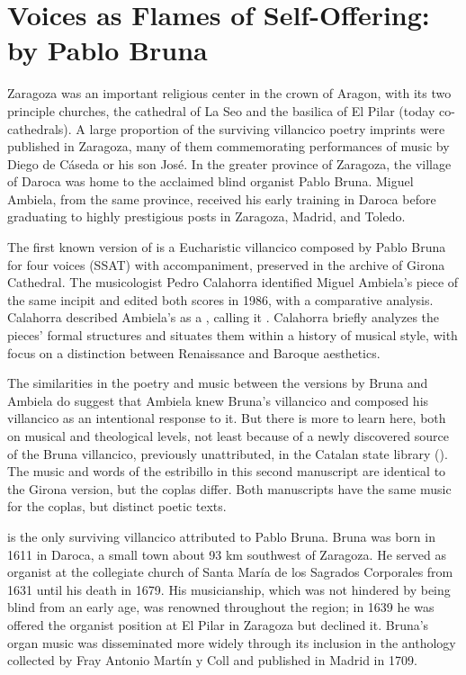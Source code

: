 \section{Voices as Flames of Self-Offering: 
 by Pablo Bruna}

Zaragoza was an important religious center in the crown of Aragon, with its two
principle churches, the cathedral of La Seo and the basilica of El Pilar (today
co-cathedrals).  
A large proportion of the surviving villancico poetry imprints were published in
Zaragoza, many of them commemorating performances of music by Diego de Cáseda or
his son José.
In the greater province of Zaragoza, the village of Daroca was home to the
acclaimed blind organist Pablo Bruna.  
Miguel Ambiela, from the same province, received his early training in Daroca
before graduating to highly prestigious posts in Zaragoza, Madrid, and Toledo.

The first known version of  is a Eucharistic
villancico composed by Pablo Bruna for four voices (SSAT) with accompaniment,
preserved in the archive of Girona Cathedral.%
    \citXXX[signature]
The musicologist Pedro Calahorra identified Miguel Ambiela's piece of the same
incipit and edited both scores in 1986, with a comparative analysis.
Calahorra described Ambiela's  as a , calling it .%
    \Autocite[9]{Calahorra:Suban}
Calahorra briefly analyzes the pieces' formal structures and situates them
within a history of musical style, with focus on a distinction between
Renaissance and Baroque aesthetics.

The similarities in the poetry and music between the versions by Bruna and
Ambiela do suggest that Ambiela knew Bruna's villancico and composed his
villancico as an intentional response to it.
But there is more to learn here, both on musical and theological levels, not
least because of a newly discovered source of the Bruna villancico, previously
unattributed, in the Catalan state library ().
The music and words of the estribillo in this second manuscript are identical to
the Girona version, but the coplas differ.  
Both manuscripts have the same music for the coplas, but distinct poetic texts.

 is the only surviving villancico attributed to Pablo
Bruna.
Bruna was born in 1611 in Daroca, a small town about 93 km southwest of
Zaragoza.
He served as organist at the collegiate church of Santa María de los Sagrados
Corporales from 1631 until his death in 1679.%
	\Autocite[104]{Calahorra:Aragon}
His musicianship, which was not hindered by being blind from an early age, was
renowned throughout the region; in 1639 he was offered the organist position at
El Pilar in Zaragoza but declined it.%
    \Autocite[123--125]{Calahorra:Aragon}
Bruna's organ music was disseminated more widely through its inclusion in the
anthology  collected by Fray
Antonio Martín y Coll and published in Madrid in 1709.

